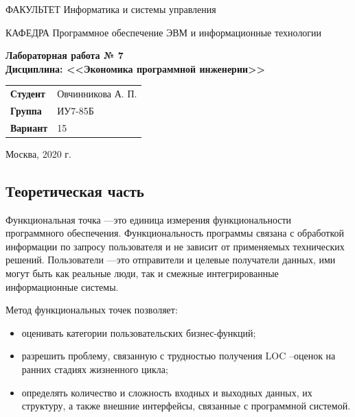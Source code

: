 \documentclass[a4paper,14pt]{article}
\begin{document}
\begin{titlepage}
    \begin{flushleft}
        ФАКУЛЬТЕТ Информатика и системы управления
    \end{flushleft}
    КАФЕДРА Программное обеспечение ЭВМ и информационные технологии

    \vspace{3cm}

    \begin{center}
        \textbf{Лабораторная работа № 7} \\
        \textbf{Дисциплина: <<Экономика программной инженерии>>}
        \vspace{0.5cm}
    \end{center}


    \vspace{3cm}

    \begin{flushleft}
        \begin{tabular}{ll}
            \textbf{Студент}       & Овчинникова А. П. \\
            \textbf{Группа}        & ИУ7-85Б           \\
            \textbf{Вариант}       & 15           \\
        \end{tabular}
    \end{flushleft}

    \vspace{3cm}

    \begin{center}
        Москва, 2020 г.
    \end{center}

\end{titlepage}

\setcounter{page}{2}

\subsection*{Теоретическая часть}

Функциональная точка —это единица измерения функциональности программного обеспечения. Функциональность программы связана с обработкой информации по запросу пользователя и не зависит от применяемых технических решений. Пользователи —это отправители и целевые получатели данных, ими могут быть как реальные люди, так и смежные интегрированные информационные системы.

Метод функциональных точек позволяет:

\begin{itemize}
    \item оценивать категории пользовательских бизнес-функций;
    \item разрешить проблему, связанную с трудностью получения LOC –оценок на ранних стадиях жизненного цикла;
    \item определять количество и сложность входных и выходных данных, их структуру, а также внешние интерфейсы, связанные с программной системой.  
\end{itemize}
\end{document}
